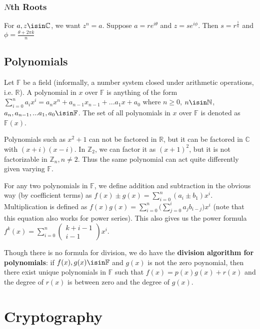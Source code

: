 \documentclass[12pt]{article}
\begin{document}
\subsubsection*{$N$th Roots}
For $a,z \isin \mathbb{C}$, we want $z^n = a$. Suppose $a = re^{i\theta}$ and $z = se^{i\phi}$. Then $s = r^\frac{1}{n}$ and $\phi = \frac{\theta + 2\pi k}{n}$

\subsection*{Polynomials}
 Let $\mathbb{F}$ be a field (informally, a number system closed under arithmetic operations, i.e. $\mathbb{R}$). A polynomial in $x$ over $\mathbb{F}$ is anything of the form $\displaystyle\sum_{i = 0}^n a_ix^i = a_nx^n + a_{n-1}x_{n-1} + ... a_1x + a_0$ where $n \geq 0$, $n \isin \mathbb{N}$, $a_n, a_{n-1}, ... a_1, a_0 \isin \mathbb{F}$. The set of all polynomials in $x$ over $\mathbb{F}$ is denoted as $\mathbb{F}(x)$.

Polynomials such as $x^2 + 1$ can not be factored in $\mathbb{R}$, but it can be factored in $\mathbb{C}$ with $(x + i)(x - i)$. In $\mathbb{Z}_2$, we can factor it as $(x + 1)^2$, but it is not factorizable in $\mathbb{Z}_n, n \neq 2$. Thus the same polynomial can act quite differently given varying $\mathbb{F}$.

For any two polynomials in $\mathbb{F}$, we define addition and subtraction in the obvious way (by coefficient terms) as $f(x) \pm g(x) = \displaystyle\sum_{i = 0}^n (a_i \pm b_1) x^i$. Multiplication is defined as $f(x)g(x) = \displaystyle\sum_{i = 0}^n \bigg( \sum_{j = 0}^i a_j b_{i-j} \bigg) x^i$ (note that this equation also works for power series). This also gives us the power formula $f^k(x) = \displaystyle\sum_{i = 0}^n \begin{pmatrix}k + i - 1 \\ i - 1\end{pmatrix} x^i$.

Though there is no formula for division, we do have the {\bf division algorithm for polynomials}: if $f(x), g(x) \isin \mathbb{F}$ and $g(x)$ is not the zero poynomial, then there exist unique polynomials in $\mathbb{F}$ such that $f(x) = p(x)g(x) + r(x)$ and the degree of $r(x)$ is between zero and the degree of $g(x)$.

\section*{Cryptography}
\end{document}
